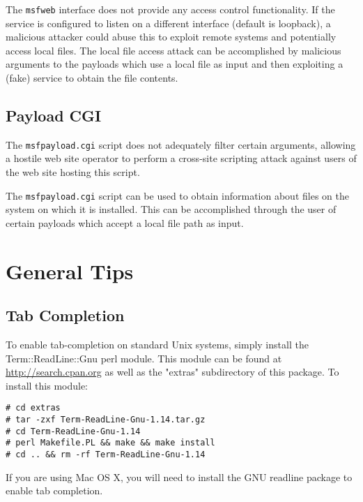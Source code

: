 \documentclass{report}
\begin{document}
\par
The \texttt{msfweb} interface does not provide any access control functionality. If
the service is configured to listen on a different interface (default is
loopback), a malicious attacker could abuse this to exploit remote systems
and potentially access local files. The local file access attack can be
accomplished by malicious arguments to the payloads which use a local file
as input and then exploiting a (fake) service to obtain the file contents.
	
	
	\section{Payload CGI}
\par
The \texttt{msfpayload.cgi} script does not adequately filter certain arguments,
allowing a hostile web site operator to perform a cross-site scripting
attack against users of the web site hosting this script.

\par
The \texttt{msfpayload.cgi} script can be used to obtain information about files on
the system on which it is installed. This can be accomplished through the
user of certain payloads which accept a local file path as input.


\pagebreak
\chapter{General Tips}


	\section{Tab Completion}
	\label{REF-TAB}
\par
To enable tab-completion on standard Unix systems, simply install the
Term::ReadLine::Gnu perl module. This module can be found at
\url{http://search.cpan.org} as well as the "extras" subdirectory of this
package. To install this module:

\begin{verbatim}
# cd extras
# tar -zxf Term-ReadLine-Gnu-1.14.tar.gz
# cd Term-ReadLine-Gnu-1.14
# perl Makefile.PL && make && make install
# cd .. && rm -rf Term-ReadLine-Gnu-1.14
\end{verbatim}

\par
If you are using Mac OS X, you will need to install the GNU readline package to
enable tab completion. 
\end{document}
